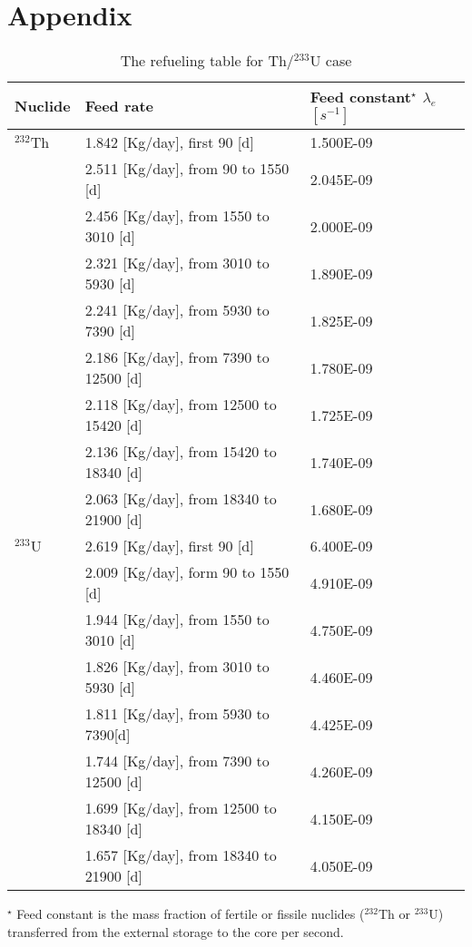 \section{Appendix}
\begin{table}[ht!]
	\centering
	\caption{The refueling table for Th/$^{233}$U case} 
	\vspace{1ex}
	\begin{tabularx}{\textwidth}{|p{1.5cm}|b|p{1.9cm}|}
		\hline
		\textbf{Nuclide} & \textbf{Feed rate} & \textbf{Feed constant$^{\star}$} $\lambda_{e}$ $[s^{-1}]$ \\
		\hline
 $^{232}$Th        &  1.842 [Kg/day], first 90 [d] & 1.500E-09 \\
	&  2.511 [Kg/day], from 90 to 1550 [d] & 		2.045E-09 \\
	&  2.456 [Kg/day], from 1550 to 3010 [d] & 		2.000E-09 \\
	&  2.321 [Kg/day], from 3010 to 5930 [d]& 		1.890E-09	\\
	&  2.241 [Kg/day], from 5930 to 7390 [d] &		1.825E-09	\\
	&  2.186 [Kg/day], from 7390 to 12500 [d] &		1.780E-09	\\
	&  2.118 [Kg/day], from 12500 to 15420 [d] &	1.725E-09	\\
	&  2.136 [Kg/day], from 15420 to 18340 [d]&		1.740E-09		\\
	&  2.063 [Kg/day], from 18340 to 21900 [d]&		1.680E-09	 \\ 
 \hline
$^{233}$U & 2.619 [Kg/day], first 90 [d]	&   6.400E-09  \\
	& 2.009 [Kg/day],  form 90 to 1550 [d] &	4.910E-09 \\
	& 1.944 [Kg/day], from 1550 to 3010 [d] &	4.750E-09 \\
	& 1.826 [Kg/day],  from 3010 to 5930 [d] &	4.460E-09 \\
	& 1.811 [Kg/day],  from 5930 to 7390[d] &	4.425E-09 \\
	& 1.744 [Kg/day], from 7390 to 12500 [d] &	4.260E-09 \\
	& 1.699 [Kg/day], from 12500 to 18340 [d]	& 4.150E-09 \\
	& 1.657 [Kg/day], from 18340 to 21900 [d]	& 4.050E-09 \\
\hline
\end{tabularx}
\begin{tablenotes}
	\small
	\item  $^{\star}$ Feed constant is the mass fraction of fertile or fissile nuclides ($^{232}$Th or $^{233}$U) transferred from the external storage to the core per second.
\end{tablenotes}
\label{tab:table8}
\end{table}	

